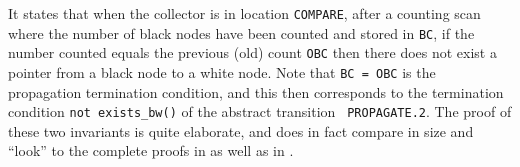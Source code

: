 It states that when the collector is in  location {\tt COMPARE}, after
a counting scan where the number of black  nodes have been counted and
stored in {\tt  BC}, if the number counted  equals the  previous (old)
count {\tt OBC} then there does not exist a pointer  from a black node
to a   white  node.  Note that   {\tt  BC =   OBC} is  the propagation
termination condition,  and this  then corresponds to  the termination
condition {\tt  not   exists\_bw()} of the  abstract  transition  {\tt
  PROPAGATE.2}.  The  proof  of    these  two invariants   is  quite
elaborate,   and does in  fact  compare  in  size  and ``look'' to the
complete  proofs in \cite{havelund-pvs-gc-99}  as well as in \cite{Rus:GC}\@. 


